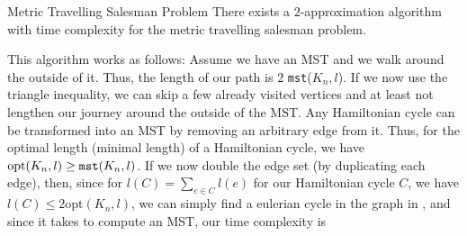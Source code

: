 \begin{theorem}[]{Metric Travelling Salesman Problem}
    There exists a $2$-approximation algorithm with time complexity  for the metric travelling salesman problem.
\end{theorem}

\shortproof This algorithm works as follows: Assume we have an MST and we walk around the outside of it. 
Thus, the length of our path is $2$ \verb|mst|($K_n, l$). 
If we now use the triangle inequality, we can skip a few already visited vertices and at least not lengthen our journey around the outside of the MST.
Any Hamiltonian cycle can be transformed into an MST by removing an arbitrary edge from it.
Thus, for the optimal length (minimal length) of a Hamiltonian cycle, we have $\text{opt}(K_n, l) \geq \verb|mst|(K_n, l)$. 
If we now double the edge set (by duplicating each edge), then, since for $l(C) = \sum_{e \in C} l(e)$ for our Hamiltonian cycle $C$, we have $l(C) \leq 2 \text{opt}(K_n, l)$, we can simply find a eulerian cycle in the graph in , and since it takes  to compute an MST, our time complexity is 
